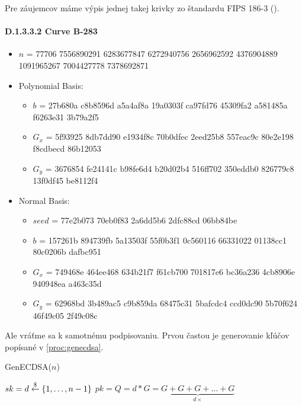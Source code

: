 \begin{poznamka}
    Pre záujemcov máme výpis jednej takej krivky zo štandardu FIPS 186-3
    (\cite{fips186}).
    \paragraph{D.1.3.3.2 Curve B-283}
    \begin{itemize}
        \item $n$ =   77706 7556890291 6283677847 6272940756 2656962592 
                    4376904889 1091965267 7004427778 7378692871
        \item Polynomial Basis:  
            \begin{itemize}
            \item $b$ = 27b680a c8b8596d a5a4af8a 19a0303f ca97fd76 45309fa2 
                    a581485a f6263e31 3b79a2f5  
            \item $G_x$ = 5f93925 8db7dd90 e1934f8c 70b0dfec 2eed25b8 557eac9c 
                    80e2e198 f8cdbecd 86b12053  
            \item $G_y$ = 3676854 fe24141c b98fe6d4 b20d02b4 516ff702 350eddb0 
                    826779c8 13f0df45 be8112f4  
            \end{itemize}
        \item Normal Basis:  
            \begin{itemize}
            \item $seed$ =  77e2b073 70eb0f83 2a6dd5b6 2dfc88cd 06bb84be  
            \item $b$ = 157261b 894739fb 5a13503f 55f0b3f1 0c560116 66331022 
                    01138cc1 80c0206b dafbc951  
            \item $G_x$ = 749468e 464ee468 634b21f7 f61cb700 701817e6 bc36a236 
                    4cb8906e 940948ea a463c35d  
            \item $G_y$ = 62968bd 3b489ac5 c9b859da 68475c31 5bafcdc4 ccd0dc90 
                    5b70f624 46f49c05 2f49c08c  
            \end{itemize}
    \end{itemize}
\end{poznamka}

Ale vráťme sa k samotnému podpisovaniu. Prvou častou je generovanie
kľúčov popísané v \ref{proc:genecdsa}.

\begin{procedure}[H]
    \caption{GenECDSA($n$)}
    \label{proc:genecdsa}
    $sk = d \overset{\$}{\leftarrow} \{1, \dots, n-1\}$ \;
    $pk = Q = d*G = \underbrace{G+G+G+\dots+G}_{d \times}$ \;
\end{procedure}

